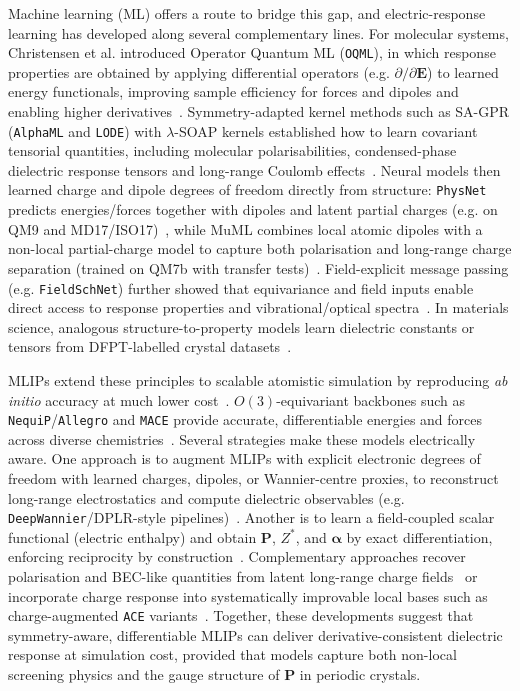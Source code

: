 \documentclass[aps,physrev,graphicx,amsmath,amssymb,
               reprint,superscriptaddress]{revtex4-2}
\begin{document}
Machine learning (ML) offers a route to bridge this gap, and
electric-response learning has developed along several
complementary lines. For molecular systems,
Christensen et al. introduced Operator Quantum ML (\texttt{OQML}), in which response properties are obtained by applying differential operators (e.g. $\partial/\partial\mathbf E$) to learned energy functionals, improving sample efficiency for forces and dipoles and enabling higher derivatives~\cite{Christensen2019OperatorsQML}. Symmetry-adapted kernel methods such as SA-GPR (\texttt{AlphaML} and \texttt{LODE}) with $\lambda$-SOAP kernels established how to learn covariant tensorial quantities, including molecular polarisabilities, condensed-phase dielectric response tensors and long-range Coulomb effects~\cite{Grisafi2018SymmetryAdaptedTensorial, wilkins2019, Grisafi2019}. Neural models then learned charge and dipole degrees of freedom directly from structure: \texttt{PhysNet} predicts energies/forces together with dipoles and latent partial charges (e.g. on QM9 and MD17/ISO17)~\cite{Unke2019PhysNet}, while MuML combines local atomic dipoles with a non-local partial-charge model to capture both polarisation and long-range charge separation (trained on QM7b with transfer tests)~\cite{Veit2020MuMLDipoles}. Field-explicit message passing (e.g. \texttt{FieldSchNet}) further showed that equivariance and field inputs enable direct access to response properties and vibrational/optical spectra~\cite{Gastegger2021FieldSchNet}. In materials science, analogous structure-to-property models learn dielectric constants or tensors from DFPT-labelled crystal datasets~\cite{Morita2020,anisonet-2024}.

MLIPs extend these principles to scalable atomistic simulation by reproducing \emph{ab initio} accuracy at much lower cost~\cite{behler-2007-bp,schutt-2018-schnet,batzner-2022-nequip}. $O(3)$-equivariant backbones such as \texttt{NequiP}/\texttt{Allegro} and \texttt{MACE} provide accurate, differentiable energies and forces across diverse chemistries~\cite{batzner-2022-nequip,batatia-2022-mace}. Several strategies make these models electrically aware. One approach is to augment MLIPs with explicit electronic degrees of freedom with learned charges, dipoles, or Wannier-centre proxies, to reconstruct long-range electrostatics and compute dielectric observables (e.g. \texttt{DeepWannier}/DPLR-style pipelines)~\cite{Zhang2020DeepWannier,Zhang2022DPLR}. Another is to learn a field-coupled scalar functional (electric enthalpy) and obtain $\mathbf P$, $Z^*$, and $\boldsymbol\alpha$ by exact differentiation, enforcing reciprocity by construction~\cite{allegro-pol-2025}. Complementary approaches recover polarisation and BEC-like quantities from latent long-range charge fields~\cite{les-2025} or incorporate charge response into systematically improvable local bases such as charge-augmented \texttt{ACE} variants~\cite{cace-2024}. Together, these developments suggest that symmetry-aware, differentiable MLIPs can deliver derivative-consistent dielectric response at simulation cost, provided that models capture both non-local screening physics and the gauge structure of $\mathbf P$ in periodic crystals.
\end{document}

